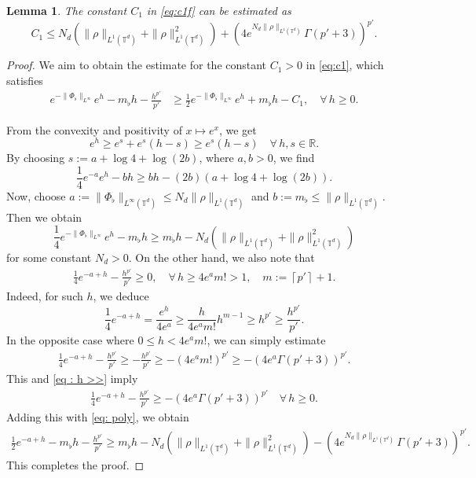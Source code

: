 \documentclass[11pt,reqno,a4paper]{amsart}
\newcommand{\R}{\mathbb{R}}
\newtheorem{lemma}{Lemma}[section]
\theoremstyle{definition}
\theoremstyle{remark}
\numberwithin{equation}{section}
\newcommand{\T} {\mathbb T}
\begin{document}
\begin{lemma}\label{lem:C1}
The constant $C_1$ in \eqref{eq:c1f} can be estimated as
\[
C_1 \le N_d(\|\rho\|_{L^1(\T^d)} + \|\rho\|_{L^1(\T^d)}^2 ) + (4e^{N_d\|\rho\|_{L^1(\T^d)}} \Gamma(p'+3))^{p'}.
\]
\end{lemma}
\begin{proof}
We aim to obtain the estimate for the constant $C_1>0$ in \eqref{eq:c1}, which satisfies
\begin{align*}
e^{-\|\Phi_\flat\|_{L^\infty}}e^{h}-m_\flat h - \frac{h^{p'}}{p'} &\ge  \frac{1}{2}e^{-\|\Phi_\flat\|_{L^\infty}}e^{h} + m_\flat h -C_1, \quad \forall \, h \geq 0.
\end{align*}


From the  convexity and positivity of $x \mapsto e^x$, we get
\[
e^h \ge e^s + e^s(h-s) \ge e^s(h-s) \quad \forall \, h,s\in \R.
\]
By choosing $s:=a +\log4 + \log(2b)$, where $a,b>0$, we find
\[
\frac{1}{4}e^{-a}e^h - bh \ge bh -(2b)(a+\log4 +\log(2b)).
\]
Now, choose $a:=\|\Phi_\flat\|_{L^\infty(\T^d)}\le N_d\|\rho\|_{L^1(\T^d)}$ and $b :=m_\flat \le \|\rho\|_{L^1(\T^d)}$. Then we obtain
\begin{equation}
\label{eq: poly}
\frac{1}{4}e^{-\|\Phi_\flat\|_{L^\infty}}e^h - m_\flat h \ge m_\flat h - N_d(\|\rho\|_{L^1(\T^d)} +\|\rho\|_{L^1(\T^d)}^2)
\end{equation}
for some constant $N_d>0$. On the other hand, we also note that
\begin{align}
\label{eq : h >>}
\frac{1}{4}e^{-a+h} - \frac{h^{p'}}{p'} \ge 0,\quad \forall \, h \ge 4e^a m!>1,\quad m:= \left\lceil p' \right\rceil +1.
\end{align}
Indeed, for such $h$, we deduce
\[
\frac{1}{4}e^{-a+h} = \frac{e^h}{4e^a} \ge \frac{h}{4e^am!}h^{m-1} \ge h^{p'} \ge \frac{h^{p'}}{p'}.
\]
In the opposite case where $0\le h< 4e^a m!$, we can simply estimate
\begin{equation*}
\begin{split}
\frac{1}{4}e^{-a+h} - \frac{h^{p'}}{p'}  \ge -\frac{h^{p'}}{p'}  \ge -(4e^a m!)^{p'} \ge - (4e^a\Gamma(p'+3))^{p'}.
\end{split}
\end{equation*}
This and \eqref{eq : h >>} imply
\begin{align*}
    \frac{1}{4}e^{-a+h} - \frac{h^{p'}}{p'} \ge -(4e^a \Gamma(p' + 3))^{p'} \quad \forall \, h\ge 0.
\end{align*}
Adding this with \eqref{eq: poly}, we obtain
\begin{align*}
    \frac{1}{2}e^{-a+h} - m_\flat h - \frac{h^{p'}}{p'} \ge m_\flat h - N_d(\|\rho\|_{L^1(\T^d)} + \|\rho\|_{L^1(\T^d)}^2 ) - (4e^{N_d\|\rho\|_{L^1(\T^d)}} \Gamma(p'+3))^{p'}.
\end{align*}
This completes the proof.
\end{proof}
\end{document}
